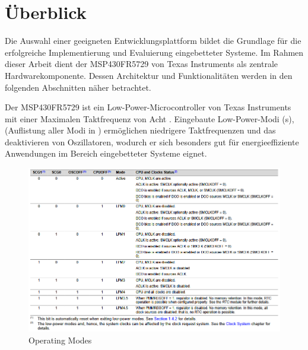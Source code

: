 
\chapter{\"Uberblick}
\label{UeberblickEntwicklungsplattform}

Die Auswahl einer geeigneten Entwicklungsplattform bildet die Grundlage f\"ur die erfolgreiche Implementierung und Evaluierung eingebetteter Systeme. Im Rahmen dieser Arbeit dient der MSP430FR5729 von Texas Instruments als zentrale Hardwarekomponente. Dessen Architektur und Funktionalit\"aten werden in den folgenden Abschnitten n\"aher betrachtet.

Der MSP430FR5729 ist ein Low-Power-Microcontroller   von Texas Instruments mit einer Maximalen Taktfrequenz von Acht . Eingebaute Low-Power-Modi (s), (Auflistung aller Modi in ) erm\"oglichen \ua niedrigere Taktfrequenzen und das deaktivieren von Oszillatoren, wodurch er sich besonders gut f\"ur energieeffiziente Anwendungen im Bereich eingebetteter Systeme eignet. 

\begin{figure}[h!]
	\centering
	\includegraphics[width=1.0\textwidth]{../Bilder/Operating_Modes.png}
	\caption{Operating Modes\\}
	\label{fig:operation_modes}
\end{figure}

